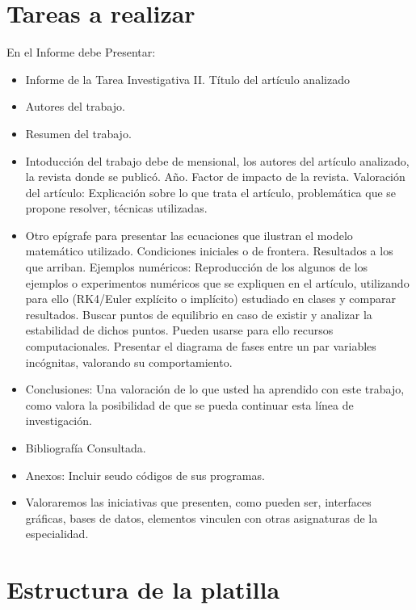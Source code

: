 \documentclass{wscpaperproc}
\theoremstyle{wsc}
\begin{document}
\maketitle
\section*{Tareas a realizar}
En el Informe debe Presentar:
\begin{itemize}
	\item Informe de la Tarea Investigativa II. Título del artículo analizado
	\item Autores del trabajo.
	\item Resumen del trabajo.
	\item Intoducción del trabajo debe de mensional, los autores del artículo analizado, la revista donde se publicó. A\~no. Factor de impacto de la revista. Valoración del artículo: Explicación sobre lo que trata el artículo, problemática que se propone resolver, técnicas utilizadas.
	\item Otro epígrafe para presentar las ecuaciones que ilustran el modelo matemático utilizado. Condiciones iniciales o de frontera. Resultados a los que arriban. Ejemplos numéricos: Reproducción de los algunos de los ejemplos o experimentos numéricos que se expliquen en el artículo, utilizando para ello (RK4/Euler explícito o implícito) estudiado en clases y comparar resultados. Buscar puntos de equilibrio en caso de existir y analizar la estabilidad de dichos puntos. Pueden usarse para ello recursos computacionales. Presentar el diagrama de fases entre un par variables incógnitas, valorando su comportamiento.
	\item Conclusiones: Una valoración de lo que usted ha aprendido con este trabajo, como valora la posibilidad de que se pueda continuar esta línea de investigación.
	\item Bibliografía Consultada.
	\item  Anexos: Incluir seudo códigos de sus programas.
	\item Valoraremos las iniciativas que presenten, como pueden ser, interfaces gráficas, bases de datos, elementos  vinculen con otras asignaturas de la especialidad.
\end{itemize}

\section*{Estructura de la platilla}
\end{document}
